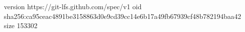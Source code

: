 version https://git-lfs.github.com/spec/v1
oid sha256:ca95ceac4891be3158863d0e9cd39cc14e6b17a49fb67939cf48b782194baa42
size 153302
